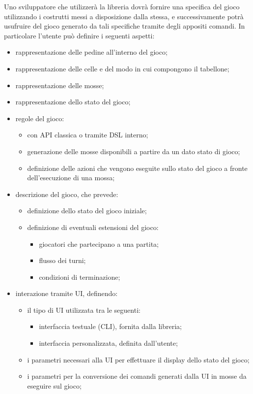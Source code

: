 Uno sviluppatore che utilizzerà la libreria dovrà fornire una specifica del gioco utilizzando i costrutti messi a disposizione dalla stessa, e successivamente potrà usufruire del gioco generato da tali specifiche tramite degli appositi comandi.
%
In particolare l'utente può definire i seguenti aspetti:
%
\begin{itemize}
    \item rappresentazione delle pedine all'interno del gioco;
    \item rappresentazione delle celle e del modo in cui compongono il tabellone;
    \item rappresentazione delle mosse;
    \item rappresentazione dello stato del gioco;
    \item regole del gioco:
    \begin{itemize}
        \item con API classica o tramite DSL interno;
        \item generazione delle mosse disponibili a partire da un dato stato di gioco;
        \item definizione delle azioni che vengono eseguite sullo stato del gioco a fronte dell'esecuzione di una mossa;
    \end{itemize}
    \item descrizione del gioco, che prevede:
    \begin{itemize}
        \item definizione dello stato del gioco iniziale;
        \item definizione di eventuali estensioni del gioco:
        \begin{itemize}
            \item giocatori che partecipano a una partita;
            \item flusso dei turni;
            \item condizioni di terminazione;
        \end{itemize}
    \end{itemize}
    \item interazione tramite UI, definendo:
    \begin{itemize}
        \item il tipo di UI utilizzata tra le seguenti:
        \begin{itemize}
            \item interfaccia testuale (CLI), fornita dalla libreria;
            \item interfaccia personalizzata, definita dall'utente;
        \end{itemize}
        \item i parametri necessari alla UI per effettuare il display dello stato del gioco;
        \item i parametri per la conversione dei comandi generati dalla UI in mosse da eseguire sul gioco;
    \end{itemize}
\end{itemize}

